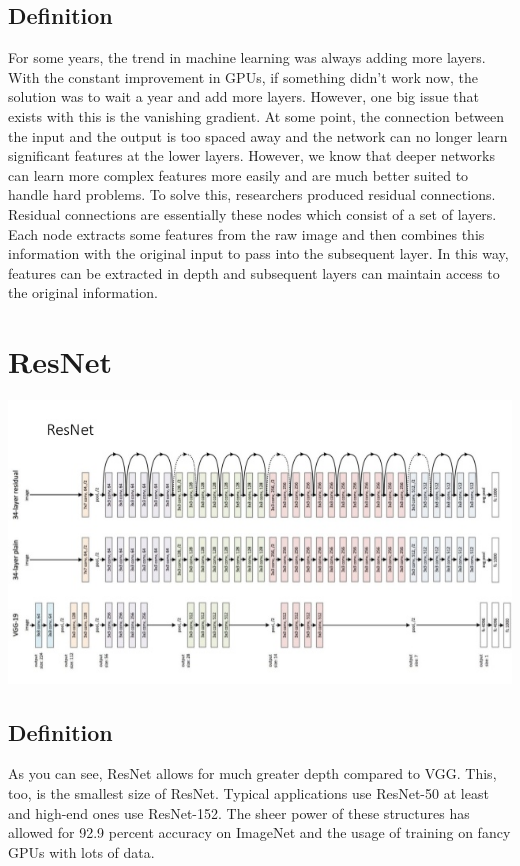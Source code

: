 \documentclass{article}
\begin{document}
\subsection{Definition}
For some years, the trend in machine learning was always adding more layers. With the constant improvement in GPUs, if something didn't work now, the solution was to wait a year and add more layers. However, one big issue that exists with this is the vanishing gradient. At some point, the connection between the input and the output is too spaced away and the network can no longer learn significant features at the lower layers. However, we know that deeper networks can learn more complex features more easily and are much better suited to handle hard problems. To solve this, researchers produced residual connections. Residual connections are essentially these nodes which consist of a set of layers. Each node extracts some features from the raw image and then combines this information with the original input to pass into the subsequent layer. In this way, features can be extracted in depth and subsequent layers can maintain access to the original information. 

\section{ResNet}
\begin{center}
\includegraphics[scale=0.5]{resnet.jpg}
\end{center}
\subsection{Definition}
As you can see, ResNet allows for much greater depth compared to VGG. This, too, is the smallest size of ResNet. Typical applications use ResNet-50 at least and high-end ones use ResNet-152. The sheer power of these structures has allowed for 92.9 percent accuracy on ImageNet and the usage of training on fancy GPUs with lots of data.
\end{document}
